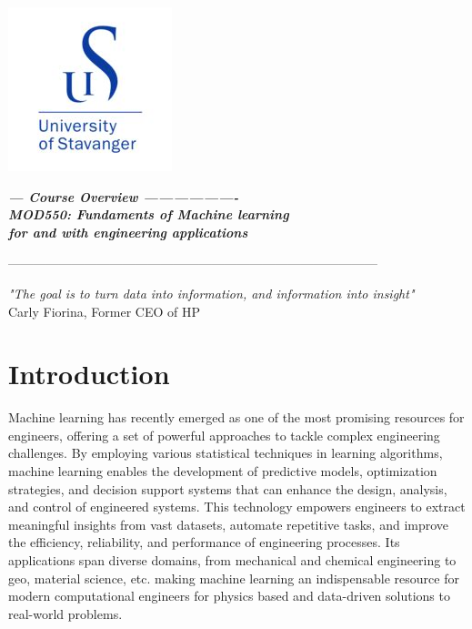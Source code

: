 \documentclass[letterpaper,12pt,oneside]{article}
\begin{document}
\begin{flushright}
\includegraphics[scale=0.5]{uis_logo.jpeg} 
\end{flushright}


\vspace{-8.3em}
\begin{flushleft}
\Large\textit{\bf  --- Course Overview ------------------- \\
MOD550: Fundaments of Machine learning \\ for and with
engineering applications   \\   }
\end{flushleft}

---------------------------------------------------------------------------------------

\vspace{1.5em}

\begin{flushleft}
\textit{"The goal is to turn data into information, and information into insight"} \\
Carly Fiorina, Former CEO of HP

\end{flushleft}

\section*{Introduction}
Machine learning has recently emerged as one of the most promising resources for engineers, offering a set of powerful approaches to tackle complex engineering challenges. By employing various statistical techniques in learning algorithms, machine learning enables the development of predictive models, optimization strategies, and decision support systems that can enhance the design, analysis, and control of engineered systems. This technology empowers engineers to extract meaningful insights from vast datasets, automate repetitive tasks, and improve the efficiency, reliability, and performance of engineering processes. Its applications span diverse domains, from mechanical and chemical engineering to geo, material science, etc. making machine learning an indispensable resource for modern computational engineers for physics based and data-driven solutions to real-world problems.
\end{document}
